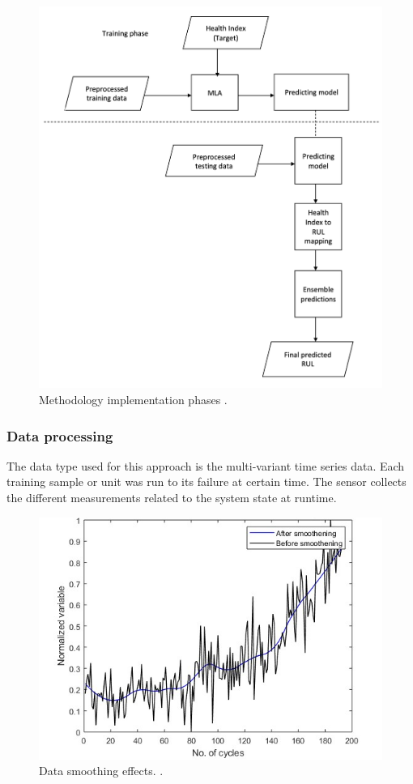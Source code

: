 \begin{figure}[ht]
    \includegraphics[width=\textwidth,]{gfx/mipet.png}
    \captionsetup{justification=centering}
    \caption{Methodology implementation phases
        \cite{Mutunga2019HealthIndexBP}.}
    \label{fig:mipet}
\end{figure}

\subsubsection{Data processing}
The data type used for this approach is the multi-variant time series data. Each training sample or unit was run to its failure at certain
time. The sensor collects the different measurements related to the system state at runtime.

\begin{figure}[ht]
    \includegraphics[width=\textwidth]{gfx/Nrmd.png}
    \captionsetup{justification=centering}
    \caption{Data smoothing effects.
        \cite{Mutunga2019HealthIndexBP}.}
    \label{fig:Nrmd}
\end{figure}

